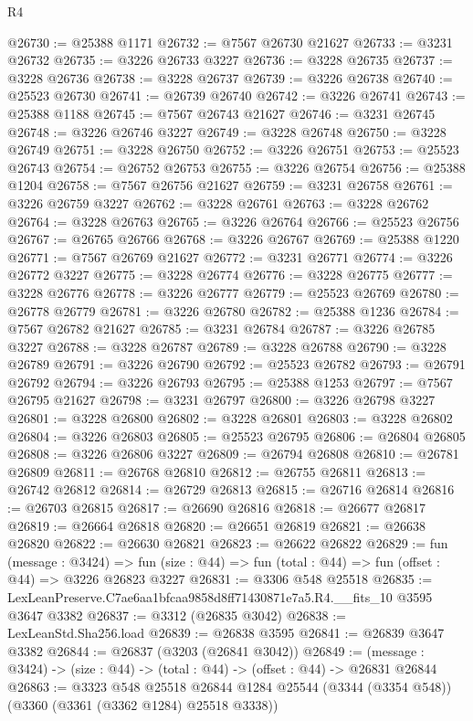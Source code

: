 \begin{lexlean}{R4}
\begin{coremodule}
@26730 := @25388 @1171
@26732 := @7567 @26730 @21627
@26733 := @3231 @26732
@26735 := @3226 @26733 @3227
@26736 := @3228 @26735
@26737 := @3228 @26736
@26738 := @3228 @26737
@26739 := @3226 @26738
@26740 := @25523 @26730
@26741 := @26739 @26740
@26742 := @3226 @26741
@26743 := @25388 @1188
@26745 := @7567 @26743 @21627
@26746 := @3231 @26745
@26748 := @3226 @26746 @3227
@26749 := @3228 @26748
@26750 := @3228 @26749
@26751 := @3228 @26750
@26752 := @3226 @26751
@26753 := @25523 @26743
@26754 := @26752 @26753
@26755 := @3226 @26754
@26756 := @25388 @1204
@26758 := @7567 @26756 @21627
@26759 := @3231 @26758
@26761 := @3226 @26759 @3227
@26762 := @3228 @26761
@26763 := @3228 @26762
@26764 := @3228 @26763
@26765 := @3226 @26764
@26766 := @25523 @26756
@26767 := @26765 @26766
@26768 := @3226 @26767
@26769 := @25388 @1220
@26771 := @7567 @26769 @21627
@26772 := @3231 @26771
@26774 := @3226 @26772 @3227
@26775 := @3228 @26774
@26776 := @3228 @26775
@26777 := @3228 @26776
@26778 := @3226 @26777
@26779 := @25523 @26769
@26780 := @26778 @26779
@26781 := @3226 @26780
@26782 := @25388 @1236
@26784 := @7567 @26782 @21627
@26785 := @3231 @26784
@26787 := @3226 @26785 @3227
@26788 := @3228 @26787
@26789 := @3228 @26788
@26790 := @3228 @26789
@26791 := @3226 @26790
@26792 := @25523 @26782
@26793 := @26791 @26792
@26794 := @3226 @26793
@26795 := @25388 @1253
@26797 := @7567 @26795 @21627
@26798 := @3231 @26797
@26800 := @3226 @26798 @3227
@26801 := @3228 @26800
@26802 := @3228 @26801
@26803 := @3228 @26802
@26804 := @3226 @26803
@26805 := @25523 @26795
@26806 := @26804 @26805
@26808 := @3226 @26806 @3227
@26809 := @26794 @26808
@26810 := @26781 @26809
@26811 := @26768 @26810
@26812 := @26755 @26811
@26813 := @26742 @26812
@26814 := @26729 @26813
@26815 := @26716 @26814
@26816 := @26703 @26815
@26817 := @26690 @26816
@26818 := @26677 @26817
@26819 := @26664 @26818
@26820 := @26651 @26819
@26821 := @26638 @26820
@26822 := @26630 @26821
@26823 := @26622 @26822
@26829 := fun (message : @3424) =>
  fun (size : @44) => fun (total : @44) => fun (offset : @44) => @3226 @26823 @3227
@26831 := @3306 @548 @25518
@26835 := LexLeanPreserve.C7ae6aa1bfcaa9858d8ff71430871e7a5.R4.__fits_10 @3595 @3647 @3382
@26837 := @3312 (@26835 @3042)
@26838 := LexLeanStd.Sha256.load
@26839 := @26838 @3595
@26841 := @26839 @3647 @3382
@26844 := @26837 (@3203 (@26841 @3042))
@26849 := (message : @3424) -> (size : @44) -> (total : @44) -> (offset : @44) -> @26831 @26844
@26863 := @3323
    @548
    @25518
    @26844
    @1284
    @25544
    (@3344 (@3354 @548))
    (@3360 (@3361 (@3362 @1284) @25518 @3338))

\end{coremodule}
\end{lexlean}
